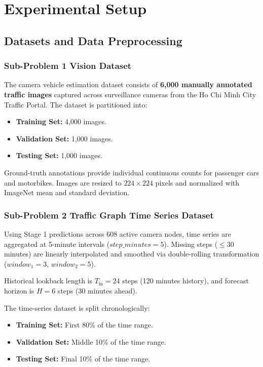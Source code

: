 \section{Experimental Setup}

\subsection{Datasets and Data Preprocessing}

\subsubsection{Sub-Problem 1 Vision Dataset}
The camera vehicle estimation dataset consists of \textbf{6,000 manually annotated traffic images} captured across surveillance cameras from the Ho Chi Minh City Traffic Portal. The dataset is partitioned into:
\begin{itemize}
    \item \textbf{Training Set:} 4,000 images.
    \item \textbf{Validation Set:} 1,000 images.
    \item \textbf{Testing Set:} 1,000 images.
\end{itemize}
Ground-truth annotations provide individual continuous counts for passenger cars and motorbikes. Images are resized to $224 \times 224$ pixels and normalized with ImageNet mean and standard deviation.

\subsubsection{Sub-Problem 2 Traffic Graph Time Series Dataset}
Using Stage 1 predictions across 608 active camera nodes, time series are aggregated at 5-minute intervals ($step\_minutes=5$). Missing steps ($\le 30$ minutes) are linearly interpolated and smoothed via double-rolling transformation ($window_1=3$, $window_2=5$).

Historical lookback length is $T_{\text{in}} = 24$ steps (120 minutes history), and forecast horizon is $H = 6$ steps (30 minutes ahead).

The time-series dataset is split chronologically:
\begin{itemize}
    \item \textbf{Training Set:} First 80\% of the time range.
    \item \textbf{Validation Set:} Middle 10\% of the time range.
    \item \textbf{Testing Set:} Final 10\% of the time range.
\end{itemize}

